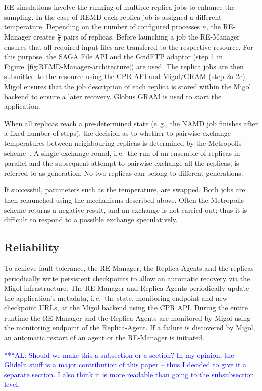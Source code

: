 \documentclass{rspublic}
\newcommand{\alnote}[1]{ {\textcolor{blue} { ***AL: #1 }}}
\newcommand{\alnote}[1]{}
\newcommand{\remanager}[1]{RE-Manager }
\begin{document}
RE simulations involve the running of multiple replica jobs to enhance the sampling. 
In the case of REMD each replica job is assigned a different temperature.  
Depending on the number of configured processes $n$, the \remanager\
creates $\frac{n}{2}$ pairs of replicas.
Before launching a job the \remanager\ ensures that all required input 
files are transfered to the respective resource. For this purpose, the SAGA File API and the
GridFTP adaptor (step 1 in Figure~\ref{fig:REMD-Manager-architecture})
are used.  The replica jobs are then submitted to the resource
using the CPR API and Migol/GRAM (step 2a-2c). Migol ensures that the
job description of each replica is stored within the Migol backend
to ensure a later recovery. Globus GRAM is used to start the
application.

When all replicas reach a pre-determined state (e.\,g., the NAMD job
finishes after a fixed number of steps), the decision as to whether to
pairwise exchange temperatures between neighbouring replicas is
determined by the Metropolis scheme~\citep{metropolis:1087}.  A single
exchange round, i.\,e.\ the run of an ensemble of replicas in parallel
and the subsequent attempt to pairwise exchange all the replicas, is
referred to as generation. No two replicas can belong to different
generations.

If successful, parameters such as the temperature, are swapped. Both
jobs are then relaunched using the mechanisms described above. Often
the Metropolis scheme returns a negative result, and an exchange is
not carried out; thus it is difficult to respond to a possible
exchange speculatively.

\subsection{Reliability}
To achieve fault tolerance, the RE-Manager, the Replica-Agents and the
replicas periodically write persistent checkpoints to allow
an automatic recovery via the Migol infrastructure. The \remanager\
and Replica-Agents periodically update the application's metadata,
i.\,e.\ the state, monitoring endpoint and new checkpoint URLs, at the
Migol backend using the CPR API. During the entire runtime the
\remanager\ and the Replica-Agents are monitored by Migol using the
monitoring endpoint of the Replica-Agent. If a failure is discovered
by Migol, an automatic restart of an agent or the RE-Manager is
initiated.

\alnote{Should we make this a subsection or a section? In my opinion,
the GlideIn stuff is a major contribution of this paper -- thus I decided to
give it a separate section. I also think it is more readable than going to the
subsubsection level.}           
\end{document}
